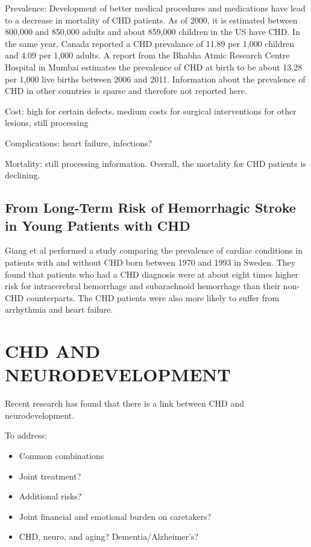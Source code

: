 Prevalence: Development of better medical procedures and medications have lead to a decrease in mortality of CHD patients. As of 2000, it is estimated between 800,000 and 850,000 adults and about 859,000 children in the US have CHD. In the same year, Canada reported a CHD prevalance of 11.89 per 1,000 children and 4.09 per 1,000 adults. A report from the Bhabha Atmic Research Centre Hospital in Mumbai estimates the prevalence of CHD at birth to be about 13.28 per 1,000 live births between 2006 and 2011. Information about the prevalence of CHD in other countries is sparse and therefore not reported here.

Cost: high for certain defects, medium costs for surgical interventions for other lesions, still processing

Complications: heart failure, infections?

Mortality: still processing information. Overall, the mortality for CHD patients is declining. 



\subsection{From Long-Term Risk of Hemorrhagic Stroke in Young Patients with CHD}
Giang et al performed a study comparing the prevalence of cardiac conditions in patients with and without CHD born between 1970 and 1993 in Sweden. They found that patients who had a CHD diagnosis were at about eight times higher risk for intracerebral hemorrhage and subarachnoid hemorrhage than their non-CHD counterparts. The CHD patients were also more likely to suffer from arrhythmia and heart failure.

\section{CHD AND NEURODEVELOPMENT}

Recent research has found that there is a link between CHD and neurodevelopment.

To address:
\begin{itemize}
\item Common combinations
\item Joint treatment?
\item Additional risks?
\item Joint financial and emotional burden on caretakers? 
\item CHD, neuro, and aging? Dementia/Alzheimer's?
\end{itemize}

